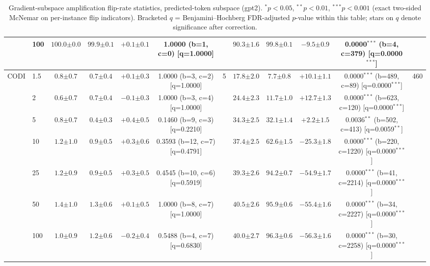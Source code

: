 \begin{table}[h!]
\begin{tabular}{l l | cccc c | cccc c}
 & 100 & $100.0 {\scriptstyle \pm 0.0}$ & $99.9 {\scriptstyle \pm 0.1}$ & $+0.1 {\scriptstyle \pm 0.1}$ & 1.0000 (b=1, c=0) [q=1.0000] &  & $90.3 {\scriptstyle \pm 1.6}$ & $99.8 {\scriptstyle \pm 0.1}$ & $-9.5 {\scriptstyle \pm 0.9}$ & 0.0000$^{***}$ (b=4, c=379) [q=0.0000$^{***}$] &  \\
\midrule
CODI & 1.5 & $0.8 {\scriptstyle \pm 0.7}$ & $0.7 {\scriptstyle \pm 0.4}$ & $+0.1 {\scriptstyle \pm 0.3}$ & 1.0000 (b=3, c=2) [q=1.0000] & 5 & $17.8 {\scriptstyle \pm 2.0}$ & $7.7 {\scriptstyle \pm 0.8}$ & $+10.1 {\scriptstyle \pm 1.1}$ & 0.0000$^{***}$ (b=489, c=89) [q=0.0000$^{***}$] & 460 \\
 & 2 & $0.6 {\scriptstyle \pm 0.7}$ & $0.7 {\scriptstyle \pm 0.4}$ & $-0.1 {\scriptstyle \pm 0.3}$ & 1.0000 (b=3, c=4) [q=1.0000] &  & $24.4 {\scriptstyle \pm 2.3}$ & $11.7 {\scriptstyle \pm 1.0}$ & $+12.7 {\scriptstyle \pm 1.3}$ & 0.0000$^{***}$ (b=623, c=120) [q=0.0000$^{***}$] &  \\
 & 5 & $0.8 {\scriptstyle \pm 0.7}$ & $0.4 {\scriptstyle \pm 0.3}$ & $+0.4 {\scriptstyle \pm 0.5}$ & 0.1460 (b=9, c=3) [q=0.2210] &  & $34.3 {\scriptstyle \pm 2.5}$ & $32.1 {\scriptstyle \pm 1.4}$ & $+2.2 {\scriptstyle \pm 1.5}$ & 0.0036$^{**}$ (b=502, c=413) [q=0.0059$^{**}$] &  \\
 & 10 & $1.2 {\scriptstyle \pm 1.0}$ & $0.9 {\scriptstyle \pm 0.5}$ & $+0.3 {\scriptstyle \pm 0.6}$ & 0.3593 (b=12, c=7) [q=0.4791] &  & $37.4 {\scriptstyle \pm 2.5}$ & $62.6 {\scriptstyle \pm 1.5}$ & $-25.3 {\scriptstyle \pm 1.8}$ & 0.0000$^{***}$ (b=220, c=1220) [q=0.0000$^{***}$] &  \\
 & 25 & $1.2 {\scriptstyle \pm 0.9}$ & $0.9 {\scriptstyle \pm 0.5}$ & $+0.3 {\scriptstyle \pm 0.5}$ & 0.4545 (b=10, c=6) [q=0.5919] &  & $39.3 {\scriptstyle \pm 2.6}$ & $94.2 {\scriptstyle \pm 0.7}$ & $-54.9 {\scriptstyle \pm 1.7}$ & 0.0000$^{***}$ (b=41, c=2214) [q=0.0000$^{***}$] &  \\
 & 50 & $1.4 {\scriptstyle \pm 1.0}$ & $1.3 {\scriptstyle \pm 0.6}$ & $+0.1 {\scriptstyle \pm 0.5}$ & 1.0000 (b=8, c=7) [q=1.0000] &  & $40.5 {\scriptstyle \pm 2.6}$ & $95.9 {\scriptstyle \pm 0.6}$ & $-55.4 {\scriptstyle \pm 1.6}$ & 0.0000$^{***}$ (b=34, c=2227) [q=0.0000$^{***}$] &  \\
 & 100 & $1.0 {\scriptstyle \pm 0.9}$ & $1.2 {\scriptstyle \pm 0.6}$ & $-0.2 {\scriptstyle \pm 0.4}$ & 0.5488 (b=4, c=7) [q=0.6830] &  & $40.0 {\scriptstyle \pm 2.7}$ & $96.3 {\scriptstyle \pm 0.6}$ & $-56.3 {\scriptstyle \pm 1.6}$ & 0.0000$^{***}$ (b=30, c=2258) [q=0.0000$^{***}$] &  \\
\bottomrule
\end{tabular}
\caption{Gradient-subspace amplification flip-rate statistics, predicted-token subspace (gpt2). $^{*}p{<}0.05$, $^{**}p{<}0.01$, $^{***}p{<}0.001$ (exact two-sided McNemar on per-instance flip indicators). Bracketed $q$ = Benjamini--Hochberg FDR-adjusted $p$-value within this table; stars on $q$ denote significance after correction.}
\label{tab:gradsubspace_predtoken_amp_stats_gpt2}
\end{table}